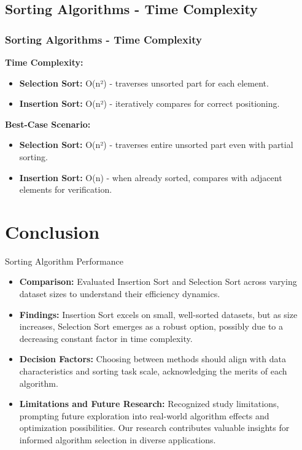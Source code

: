\documentclass{beamer}
\begin{document}
\subsection{Sorting Algorithms - Time Complexity}
\begin{frame}
  \frametitle{Sorting Algorithms - Time Complexity}
  
  \textbf{Time Complexity:}
  \begin{itemize}
    \item \textbf{Selection Sort:} O(n²) - traverses unsorted part for each element.
    \item \textbf{Insertion Sort:} O(n²) - iteratively compares for correct positioning.
  \end{itemize}
  
  \textbf{Best-Case Scenario:}
  \begin{itemize}
    \item \textbf{Selection Sort:} O(n²) - traverses entire unsorted part even with partial sorting.
    \item \textbf{Insertion Sort:} O(n) - when already sorted, compares with adjacent elements for verification.
  \end{itemize}

\end{frame}

\section{Conclusion}
\begin{frame}{Sorting Algorithm Performance}
  \begin{itemize}
    \item \textbf{Comparison:} Evaluated Insertion Sort and Selection Sort across varying dataset sizes to understand their efficiency dynamics.
    
    \item \textbf{Findings:} Insertion Sort excels on small, well-sorted datasets, but as size increases, Selection Sort emerges as a robust option, possibly due to a decreasing constant factor in time complexity.
    
    \item \textbf{Decision Factors:} Choosing between methods should align with data characteristics and sorting task scale, acknowledging the merits of each algorithm.
    
    \item \textbf{Limitations and Future Research:} Recognized study limitations, prompting future exploration into real-world algorithm effects and optimization possibilities. Our research contributes valuable insights for informed algorithm selection in diverse applications.
  \end{itemize}
\end{frame}
\end{document}
